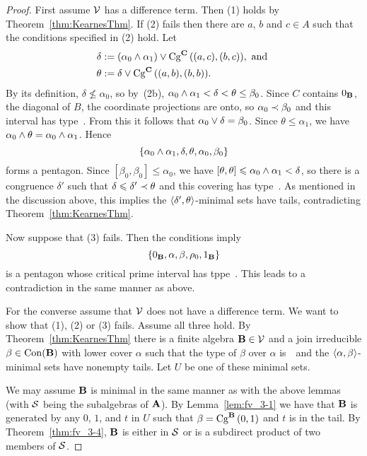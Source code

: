 \begin{proof}
First assume $\sV$ has a difference term.
Then (1) holds by Theorem~\ref{thm:KearnesThm}.
If (2) fails then there are $a$, $b$ and $c\in A$ such
that the conditions specified in (2) hold. 
Let 
\begin{align*}
\delta &:= (\alpha_0 \meet \alpha_1) \join \Cga {(a,c)} {(b,c)} C, \text{ and }\\
\theta &:= \delta \join \Cga {(a,b)}{(b,b)} C.
\end{align*}
By its definition, $\delta \nleq \alpha_0$,
so by~(2b), $\alpha_0\meet\alpha_1 < \delta < \theta \le \beta_0$.
Since $C$ contains $0_{\alg B}$, the diagonal of $B$, the coordinate
projections are onto, so $\alpha_0 \cov \beta_0$ and this interval 
has type~\atyp. 
From this it follows that $\alpha_0 \join \delta = \beta_0$.
Since $\theta \le \alpha_1$, we have $\alpha_0 \meet \theta = \alpha_0\meet\alpha_1$.
Hence
\[
\{\alpha_0\meet\alpha_1, \delta, \theta, \alpha_0, \beta_0 \}
\]
forms a pentagon.
Since $[\beta_0,\beta_0] \leq \alpha_0$, we have
$[\theta,\theta] \leq \alpha_0\meet\alpha_1 < \delta$,
so there is a congruence $\delta'$ such that 
$\delta\leq \delta' \cov \theta$ and this covering has
type~\atyp.
As mentioned in the discussion above, this implies the
$\la \delta',\theta\ra$-minimal sets have tails, contradicting
Theorem~\ref{thm:KearnesThm}.

Now suppose that (3) fails. Then the conditions imply
\[
\{0_{\alg B}, \alpha, \beta, \rho_0, 1_{\alg B} \}
\]
is a pentagon whose critical prime interval has tppe~\atyp. This 
leads to a contradiction in the same manner as above.

For the converse assume that $\sV$ does not have a difference 
term. 
We want to show that (1), (2) or (3) fails. Assume all three hold.
By Theorem~\ref{thm:KearnesThm} there is a finite 
algebra $\alg B \in \sV$ and a join irreducible 
$\beta \in \op{Con}(\alg B)$ with lower cover 
$\alpha$ such that the type of $\beta$ over $\alpha$ is~\atyp\
and the $\la\alpha,\beta\ra$-minimal sets have
nonempty tails. Let $U$ be one of these minimal sets.


We may assume $\alg B$ is minimal in the same manner as with the
above lemmas (with $\sS$ being the subalgebras of $\alg A$).
By Lemma~\ref{lem:fv_3-1} 
we have that $\alg B$ is generated by any $0$, $1$, and $t$ in
$U$ such
that $\beta = \Cga 01{B}$ and $t$ is in the tail. By 
Theorem~\ref{thm:fv_3-4}, $\alg B$ is either 
in $\sS$ or is a subdirect product of two members of $\sS$.


\end{proof}
